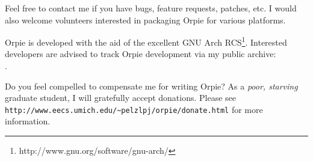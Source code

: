 \documentclass[11pt,notitlepage]{article}
\begin{document}
\noindent
Feel free to contact me if you have bugs, feature requests, patches, etc.  I 
would also welcome volunteers interested in packaging Orpie for various platforms.

Orpie is developed with the aid of the excellent GNU Arch
RCS\footnote{http://www.gnu.org/software/gnu-arch/}.  Interested 
developers are advised to track Orpie development via my public archive: \\
 .  

Do you feel compelled to compensate me for writing Orpie?  As a {\em poor, 
starving} graduate student, I will gratefully accept donations.  Please see \\
{\tt http://www.eecs.umich.edu/\~{}pelzlpj/orpie/donate.html} for more information.
\end{document}
